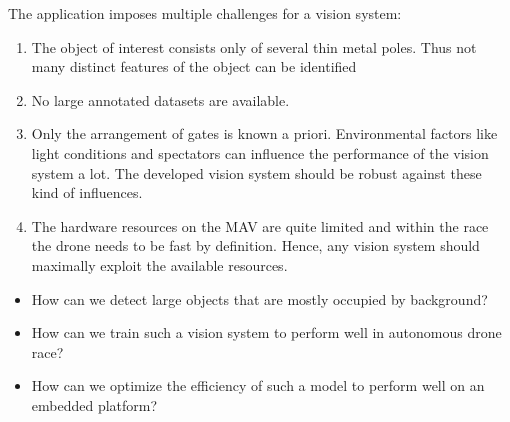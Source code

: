 The application imposes multiple challenges for a vision system:
\begin{enumerate}
	\item The object of interest consists only of several thin metal poles. Thus not many distinct features of the object can be identified
	\item No large annotated datasets are available. 
	\item Only the arrangement of gates is known a priori. Environmental factors like light conditions and spectators can influence the performance of the vision system a lot. The developed vision system should be robust against these kind of influences.
	\item The hardware resources on the MAV are quite limited and within the race the drone needs to be fast by definition. Hence, any vision system should maximally exploit the available resources.
\end{enumerate} 




\begin{itemize}
	\item How can we detect large objects that are mostly occupied by background?
	\item How can we train such a vision system to perform well in autonomous drone race?
	\item How can we optimize the efficiency of such a model to perform well on an embedded platform?
\end{itemize}